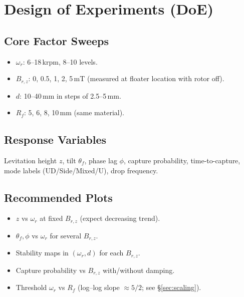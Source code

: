 \documentclass[11pt]{article}
\theoremstyle{definition}
\theoremstyle{plain}
\begin{document}
\section{Design of Experiments (DoE)}

\subsection{Core Factor Sweeps}
\begin{itemize}[leftmargin=1.5em]
  \item \(\omega_r\): 6--18\,krpm, 8--10 levels.
  \item \(B_{r,z}\): 0, 0.5, 1, 2, 5\,mT (measured at floater location with rotor off).
  \item \(d\): 10--40\,mm in steps of 2.5--5\,mm.
  \item \(R_f\): 5, 6, 8, 10\,mm (same material).
\end{itemize}

\subsection{Response Variables}
Levitation height \(z\), tilt \(\theta_f\), phase lag \(\phi\), capture probability, time-to-capture, mode labels (UD/Side/Mixed/U), drop frequency.

\subsection{Recommended Plots}
\begin{itemize}[leftmargin=1.5em]
  \item \(z\) vs \(\omega_r\) at fixed \(B_{r,z}\) (expect decreasing trend).
  \item \(\theta_f,\phi\) vs \(\omega_r\) for several \(B_{r,z}\).
  \item Stability maps in \((\omega_r,d)\) for each \(B_{r,z}\).
  \item Capture probability vs \(B_{r,z}\) with/without damping.
  \item Threshold \(\omega_r\) vs \(R_f\) (log–log slope \(\approx 5/2\); see \S\ref{sec:scaling}).
\end{itemize}
\end{document}
